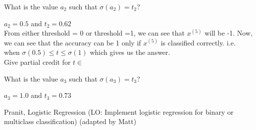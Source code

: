 \begin{parts}
\begin{subparts}
    \subpart[2] What is the value $a_2$ such that $\sigma(a_2) = t_2$?
    \begin{tcolorbox}[fit,height=1.5cm, width=6cm, blank, borderline={1pt}{-2pt}]
    \end{tcolorbox}
    \begin{soln}
        $a_2 = 0.5$ and $t_2 = 0.62$ \\ 
        From either threshold = 0 or threshold =1, we can see that $x^{(5)}$ will be -1. Now, we can see that the accuracy can be 1 only if $x^{(5)}$ is classified correctly.  i.e. when $ \sigma(0.5) \le t \le \sigma(1)$ which gives us the answer.  \\
        Give partial credit for $t \in $
    \end{soln}

    \subpart[2] What is the value $a_3$ such that $\sigma(a_3) = t_3$?
    \begin{tcolorbox}[fit,height=1.5cm, width=6cm, blank, borderline={1pt}{-2pt}]
    \end{tcolorbox}
    \begin{soln}
        $a_3 = 1.0$ and $t_3 = 0.73$ \\
    \end{soln}

    \end{subparts}
    \begin{qauthor}
    Pranit, Logistic Regression (LO:  Implement logistic regression for binary or multiclass classification)
    (adapted by Matt)
    \end{qauthor}
    
\begin{comment} 
\part \textbf{Matching:} Consider the three algorithms and four update rules shown below. For any algorithm that requires it, assume we are using a fixed learning rate $\gamma$. Match each algorithm to its update rule. It is possible that multiple algorithms may match to the same rule. Assume the bias term is folded into $\thetav$.
    

\end{comment}
\end{parts}
